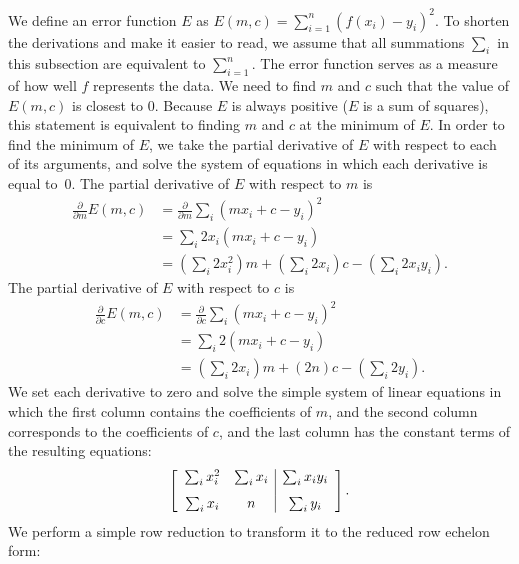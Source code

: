 \documentclass[11pt, oneside, reqno]{book}
\begin{document}
	We define an error function $E$ as $E(m,c) = \sum_{i=1}^n \left(f(x_i) - y_i\right)^2$. To shorten the derivations and make it easier to read, we assume that all summations $\sum_i$ in this subsection are equivalent to $\sum_{i=1}^n$. The error function serves as a measure of how well $f$ represents the data. We need to find $m$ and $c$ such that the value of $E(m, c)$ is closest to $0$. Because $E$ is always positive ($E$ is a sum of squares), this statement is equivalent to finding $m$ and $c$ at the minimum of $E$. In order to find the minimum of $E$, we take the partial derivative of $E$ with respect to each of its arguments, and solve the system of equations in which each derivative is equal to~$0$. 
	The partial derivative of $E$ with respect to $m$ is
	\begin{align*}
	\frac{\partial}{\partial m} E(m,c) 
	&= \frac{\partial}{\partial m} \sum_i \left(mx_i+c-y_i\right)^2 \\
	&= \sum_{i} 2x_i \left(mx_i + c - y_i\right) \\
	&= \left(\sum_{i} 2x_i^2\right) m 
	+ \left(\sum_{i} 2x_i \right) c
	- \left(\sum_{i} 2x_iy_i\right).
	\end{align*}
	The partial derivative of $E$ with respect to $c$ is
	\begin{align*}
	\frac{\partial}{\partial c} E(m,c) 
	&= \frac{\partial}{\partial c} \sum_{i} \left(mx_i+c-y_i\right)^2 \\
	&= \sum_{i} 2 \left(mx_i + c - y_i\right) \\
	&= \left(\sum_{i} 2x_i\right) m 
	+ (2n) c
	- \left(\sum_{i} 2y_i\right).
	\end{align*}
	We set each derivative to zero and solve the simple system of linear equations in which the first column contains the coefficients of $m$, and the second column corresponds to the coefficients of $c$, and the last column has the constant terms of the resulting equations:
	\[
	\left[
	\begin{array}{c c | c}
	\sum_{i} x_i^2 & \sum_{i} x_i & \sum_{i} x_iy_i \\ [7 pt]
	\sum_{i} x_i   & 	n 			  & \sum_{i} y_i 
	\end{array}
	\right].
	\]
	We perform a simple row reduction to transform it to the reduced row echelon form:
\end{document}
